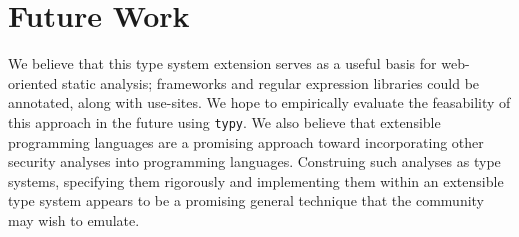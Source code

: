 \documentclass[10pt]{sigplanconf}
\theoremstyle{definition}
\begin{document}

\section{Future Work}

We believe that this type system extension serves as a useful basis for web-oriented static analysis;
frameworks and regular expression libraries could be annotated, along with use-sites. We hope to empirically evaluate the feasability of this approach in the future using \verb|typy|. 
%
We also believe that extensible programming languages are a promising approach toward incorporating other security
 analyses into programming languages. Construing such analyses as type systems, specifying them rigorously and implementing them within an extensible type system appears to be a promising general technique that the community may wish to emulate.
%


\end{document}
